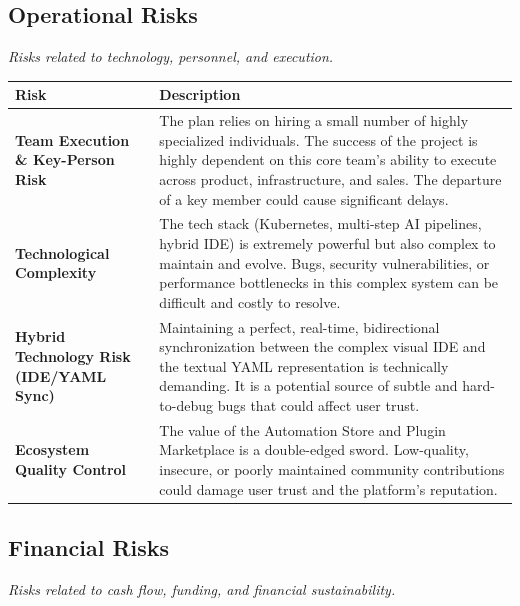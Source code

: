 \documentclass[11pt, a4paper, oneside]{article}
\begin{document}
\newpage
\subsection{Operational Risks}
\textit{Risks related to technology, personnel, and execution.}

\begin{table}[H]
\centering
\begin{tabularx}{\textwidth}{@{}lL@{}}
\toprule
\textbf{Risk} & \textbf{Description} \\
\midrule
\textbf{Team Execution \& Key-Person Risk} & The plan relies on hiring a small number of highly specialized individuals. The success of the project is highly dependent on this core team's ability to execute across product, infrastructure, and sales. The departure of a key member could cause significant delays. \\
\addlinespace
\textbf{Technological Complexity} & The tech stack (Kubernetes, multi-step AI pipelines, hybrid IDE) is extremely powerful but also complex to maintain and evolve. Bugs, security vulnerabilities, or performance bottlenecks in this complex system can be difficult and costly to resolve. \\
\addlinespace
\textbf{Hybrid Technology Risk (IDE/YAML Sync)} & Maintaining a perfect, real-time, bidirectional synchronization between the complex visual IDE and the textual YAML representation is technically demanding. It is a potential source of subtle and hard-to-debug bugs that could affect user trust. \\
\addlinespace
\textbf{Ecosystem Quality Control} & The value of the Automation Store and Plugin Marketplace is a double-edged sword. Low-quality, insecure, or poorly maintained community contributions could damage user trust and the platform's reputation. \\
\bottomrule
\end{tabularx}
\end{table}

\newpage
\subsection{Financial Risks}
\textit{Risks related to cash flow, funding, and financial sustainability.}
\end{document}
